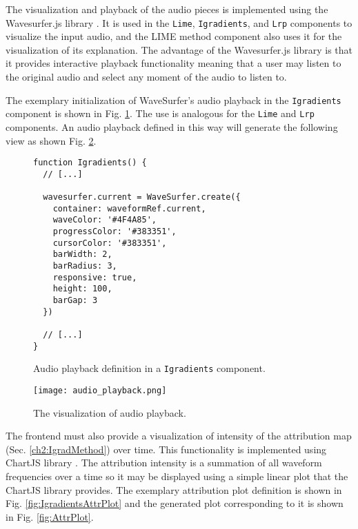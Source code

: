 \documentclass[
    bindingoffset=5mm,  %
    footnoteindent=3mm, %
    hyphenation=true    %
]{src/wut-thesis}
\begin{document}
The visualization and playback of the audio pieces is implemented using the Wavesurfer.js
library \cite{WavesurferDOC}. It is used in the \texttt{Lime}, \texttt{Igradients}, and \texttt{Lrp}
components to visualize the input audio, and the LIME method component also uses it for the
visualization of its explanation. The advantage of the Wavesurfer.js library is that it
provides interactive playback functionality meaning that a user may listen to the original
audio and select any moment of the audio to listen to.

The exemplary initialization of WaveSurfer's audio playback in the \texttt{Igradients} component is shown
in Fig. \ref{fig:IgradientsAudioPlayback}. The use is analogous for the \texttt{Lime} and \texttt{Lrp} components.
An audio playback defined in this way will generate the following view as shown Fig. \ref{fig:AudioPlayback}.

\begin{figure}%
\begin{verbatim}
function Igradients() {
  // [...]

  wavesurfer.current = WaveSurfer.create({
    container: waveformRef.current,
    waveColor: '#4F4A85',
    progressColor: '#383351',
    cursorColor: '#383351',
    barWidth: 2,
    barRadius: 3,
    responsive: true,
    height: 100,
    barGap: 3
  })

  // [...]
}
\end{verbatim}
\caption{Audio playback definition in a \texttt{Igradients} component.}
\label{fig:IgradientsAudioPlayback}
\end{figure}

\begin{figure}[h!] %
    \centering
    \texttt{[image: audio\_playback.png]}
    \caption{The visualization of audio playback.}
    \label{fig:AudioPlayback}
\end{figure}


The frontend must also provide a visualization of intensity of the attribution map
(Sec. \ref{ch2:IgradMethod}) over time.
This functionality is implemented using ChartJS library \cite{ChartJsDoc}.
The attribution intensity is a summation of all waveform frequencies over a time so it may
be displayed using a simple linear plot that the ChartJS library provides.
The exemplary attribution plot definition is shown in Fig. \ref{fig:IgradientsAttrPlot}
and the generated plot corresponding to it is shown in Fig. \ref{fig:AttrPlot}.
\end{document}
